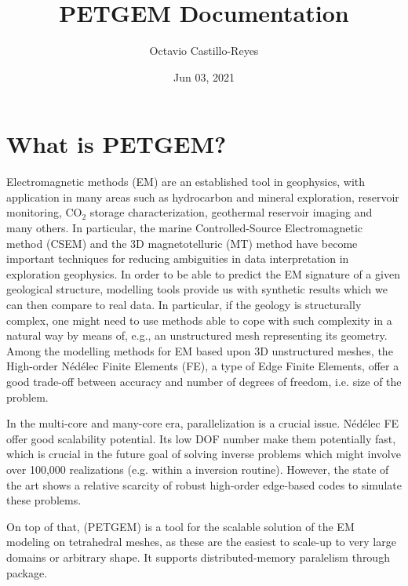 \documentclass[letterpaper,10pt,english]{sphinxmanual}
\title{PETGEM Documentation}
\date{Jun 03, 2021}
\author{Octavio Castillo-Reyes}
\begin{document}
\pagestyle{empty}
\sphinxmaketitle
\pagestyle{plain}
\sphinxtableofcontents
\pagestyle{normal}
\label{\detokenize{index::doc}}



\chapter{What is PETGEM?}
\label{\detokenize{WhatIs:what-is-petgem}}\label{\detokenize{WhatIs:id1}}\label{\detokenize{WhatIs::doc}}
Electromagnetic methods (EM) are an established tool in geophysics, with
application in many areas such as hydrocarbon and mineral exploration,
reservoir monitoring, CO$_{\text{2}}$ storage characterization, geothermal reservoir
imaging and many others. In particular, the marine Controlled-Source
Electromagnetic method (CSEM) and the 3D magnetotelluric (MT) method have become
important techniques for reducing ambiguities in data interpretation
in exploration geophysics. In order to be
able to predict the EM signature of a given geological structure, modelling
tools provide us with synthetic results which we can then compare to real data.
In particular, if the geology is structurally complex, one might need to use
methods able to cope with such complexity in a natural way by means of, e.g.,
an unstructured mesh representing its geometry. Among the modelling methods
for EM based upon 3D unstructured meshes, the High-order Nédélec Finite Elements (FE),
a type of Edge Finite Elements, offer a good trade-off between accuracy and number
of degrees of freedom, i.e. size of the problem.

In the multi-core and many-core era, parallelization is a crucial issue.
Nédélec FE offer good scalability potential. Its low DOF number make them potentially fast, which is
crucial in the future goal of solving inverse problems which might
involve over 100,000 realizations (e.g. within a inversion routine). However, the state of the art shows a
relative scarcity of robust high-order edge-based codes to simulate these problems.

On top of that,  (PETGEM) is a  tool
for the scalable solution of the EM modeling on tetrahedral meshes, as these are the
easiest to scale-up to very large domains or arbitrary shape. It supports
distributed-memory paralelism through 
package.
\end{document}

